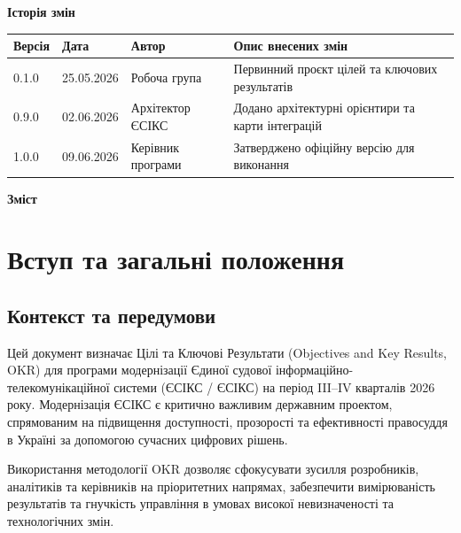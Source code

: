 \documentclass{article}
\begin{document}
\vspace{20pt}
\begin{center}
  {\large\color{nato}\bfseries Історія змін\par}
\end{center}
\vspace{10pt}
\begin{longtable}{@{}p{1.5cm}p{2.0cm}p{3.0cm}p{7.0cm}@{}}
\toprule
\textbf{Версія} & \textbf{Дата} & \textbf{Автор} & \textbf{Опис внесених змін} \\
\midrule
0.1.0 & 25.05.2026 & Робоча група & Первинний проєкт цілей та ключових результатів \\
0.9.0 & 02.06.2026 & Архітектор ЄСІКС & Додано архітектурні орієнтири та карти інтеграцій \\
1.0.0 & 09.06.2026 & Керівник програми & Затверджено офіційну версію для виконання \\
\bottomrule
\end{longtable}

\newpage
\begin{center}
  {\Huge\color{nato}\bfseries Зміст\par}
\end{center}
\vspace{40pt}
\tableofcontents

\newpage

\section{Вступ та загальні положення}

\subsection{Контекст та передумови}
Цей документ визначає Цілі та Ключові Результати (Objectives and Key Results, OKR) для програми модернізації Єдиної судової інформаційно-телекомунікаційної системи (ЄСІКС / ЄСІКС) на період III--IV кварталів 2026 року. Модернізація ЄСІКС є критично важливим державним проектом, спрямованим на підвищення доступності, прозорості та ефективності правосуддя в Україні за допомогою сучасних цифрових рішень.

Використання методології OKR дозволяє сфокусувати зусилля розробників, аналітиків та керівників на пріоритетних напрямах, забезпечити вимірюваність результатів та гнучкість управління в умовах високої невизначеності та технологічних змін.
\end{document}
